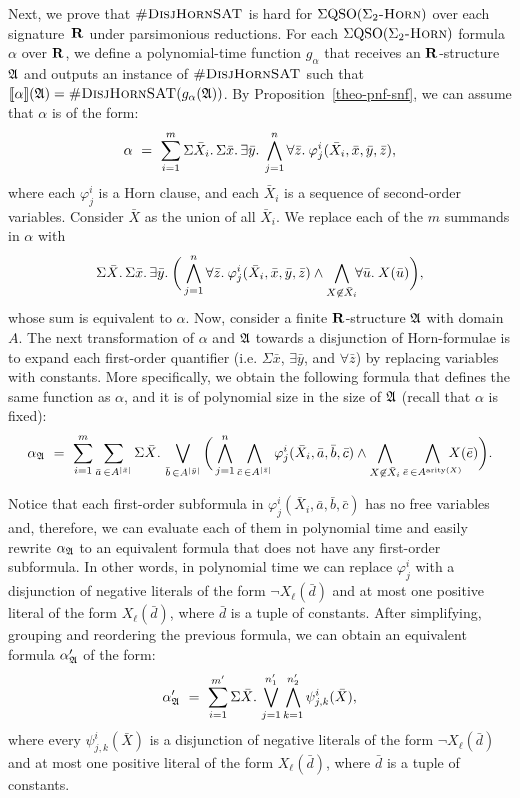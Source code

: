 Next, we prove that $\textsc{\#DisjHornSAT}$ is hard for $\Sigma{\rm QSO}(\Sigma_2\textsc{-Horn})$ over each signature~$\mathbf{R}$ under parsimonious reductions. For each $\Sigma{\rm QSO}(\Sigma_2\textsc{-Horn})$ formula $\alpha$ over $\mathbf{R}$, we define a polynomial-time function $g_{\alpha}$ that receives an $\mathbf{R}$-structure $\mathfrak{A}$ and outputs an instance of $\textsc{\#DisjHornSAT}$ such that ${\llbracket{}{\alpha}\rrbracket}(\mathfrak{A}) = \textsc{\#DisjHornSAT}(g_{\alpha}(\mathfrak{A}))$. By Proposition~\ref{theo-pnf-snf}, we can assume that $\alpha$ is of the form:
$$
\alpha \ = \ \sum_{i = 1}^{m} \Sigma{\bar{X}_{i}}.\,\Sigma{\bar{x}}.\, \exists{\bar{y}}.\: \bigwedge_{j = 1}^{n} \forall{\bar{z}}.\: \varphi^i_j(\bar{X}_{i},\bar{x},\bar{y},\bar{z}),
$$
where each $\varphi^i_j$ is a Horn clause, and each $\bar{X}_{i}$ is a sequence of second-order variables.
Consider $\bar{X}$ as the union of all $\bar{X}_{i}$. We replace each of the $m$ summands in $\alpha$ with
$$
\Sigma{\bar{X}}.\,\Sigma{\bar{x}}.\, \exists{\bar{y}}.\: \bigg( \bigwedge_{j = 1}^{n} \forall{\bar{z}}.\: \varphi^i_j(\bar{X}_{i},\bar{x},\bar{y},\bar{z})\wedge\bigwedge_{X\not\in\bar{X}_{i}}\!\!\forall{\bar{u}}.\:X(\bar{u})\bigg),
$$
whose sum is equivalent to $\alpha$.
Now, consider a finite $\mathbf{R}$-structure $\mathfrak{A}$ with domain $A$. 
The next transformation of $\alpha$ and $\mathfrak{A}$ towards a disjunction of Horn-formulae is to expand each first-order quantifier (i.e. $\Sigma{\bar{x}}$,  $\exists\bar{y}$, and $\forall\bar{z}$) by replacing variables with constants.
More specifically, we obtain the following formula that defines the same function as $\alpha$, and it is of polynomial size in the size of $\mathfrak{A}$ (recall that $\alpha$ is fixed):
$$
\alpha_{\mathfrak{A}} \ = \ \sum_{i = 1}^{m} \sum_{\bar{a}\,\in A^{\vert \bar{x} \vert}} \Sigma{\bar{X}}.\,\bigvee_{\bar{b}\,\in A^{\vert \bar{y} \vert}}\bigg(\bigwedge_{j = 1}^n\bigwedge_{\bar{c}\,\in A^{\vert \bar{z} \vert}}\varphi^i_j(\bar{X}_i,\bar{a},\bar{b},\bar{c})\wedge \bigwedge_{X \not\in \bar{X}_i}\bigwedge_{\bar{e}\,\in A^{{\rm arity}(X)}}\!\!\!\!\!\!\! X(\bar{e})\bigg).
$$

Notice that each first-order subformula in $\varphi^i_j(\bar{X}_i,\bar{a},\bar{b},\bar{c})$ has no free variables and, therefore, we can evaluate each of them in polynomial time and easily rewrite $\alpha_{\mathfrak{A}}$ to an equivalent formula that does not have any first-order subformula. In other words, in polynomial time we can replace $\varphi^i_j$ with a disjunction of negative literals of the form $\neg X_{\ell}(\bar d)$ and at most one positive literal of the form $X_{\ell}(\bar d)$, where $\bar d$ is a tuple of constants. After simplifying, grouping and reordering the previous formula, we can obtain an equivalent formula $\alpha_{\mathfrak{A}}'$ of the form:
$$
\alpha_{\mathfrak{A}}' \ = \ \sum_{i = 1}^{m'}\Sigma{\bar{X}}.\,\bigvee_{j = 1}^{n_1'}\bigwedge_{k = 1}^{n_2'}\psi^{i}_{j,k}(\bar{X}),
$$
where every $\psi^{i}_{j,k}(\bar{X})$ is a disjunction of 
negative literals of the form $\neg X_{\ell}(\bar d)$ and at most one positive literal of the form $X_{\ell}(\bar d)$, where $\bar d$ is a tuple of constants. 

